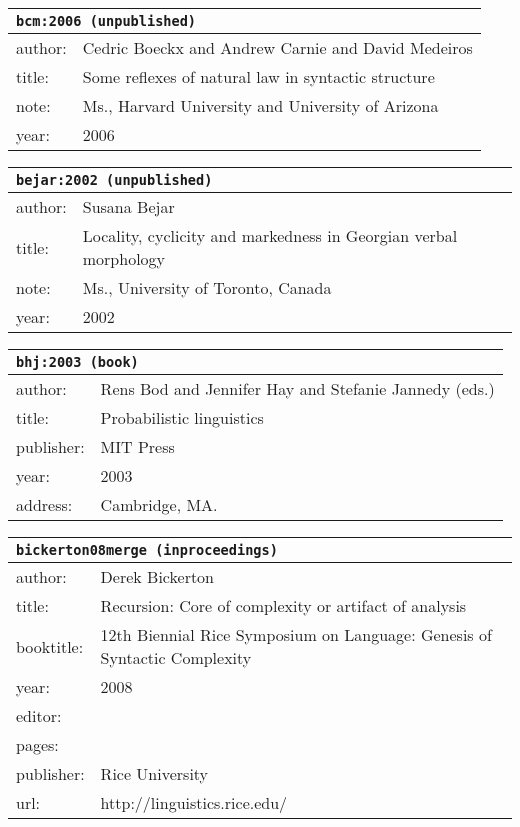 \documentclass{article}
\begin{document}
\bigskip

\begin{tabular}{p{}p{}}
\multicolumn{2}{l}{\texttt{bcm:2006 (unpublished)}}\\
\hline
author: & Cedric Boeckx and Andrew Carnie and David Medeiros\\
title: & Some reflexes of natural law in syntactic structure\\
note: & \textsc{M}s., Harvard University and University of Arizona\\
year: & 2006\\
\end{tabular}

\bigskip

\begin{tabular}{p{}p{}}
\multicolumn{2}{l}{\texttt{bejar:2002 (unpublished)}}\\
\hline
author: & Susana Bejar\\
title: & Locality, cyclicity and markedness in Georgian verbal morphology\\
note: & \textsc{M}s., University of Toronto, Canada\\
year: & 2002\\
\end{tabular}

\bigskip

\begin{tabular}{p{}p{}}
\multicolumn{2}{l}{\texttt{bhj:2003 (book)}}\\
\hline
author: & Rens Bod and Jennifer Hay and Stefanie Jannedy (eds.)\\
title: & Probabilistic linguistics\\
publisher: & MIT Press\\
year: & 2003\\
address: & Cambridge, MA.\\
\end{tabular}

\bigskip

\begin{tabular}{p{}p{}}
\multicolumn{2}{l}{\texttt{bickerton08merge (inproceedings)}}\\
\hline
author: & Derek Bickerton\\
title: & Recursion: Core of complexity or artifact of analysis\\
booktitle: & 12th Biennial Rice Symposium on Language: Genesis of Syntactic Complexity\\
year: & 2008\\
editor: & \\
pages: & \\
publisher: & Rice University\\
url: & http://linguistics.rice.edu/\\
\end{tabular}
\end{document}
